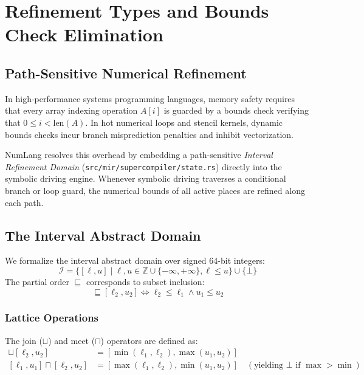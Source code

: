 \chapter{Refinement Types and Bounds Check Elimination}
\label{chap:refinements}

\section{Path-Sensitive Numerical Refinement}
\label{sec:refinements:intro}

In high-performance systems programming languages, memory safety requires that every array indexing operation $A[i]$ is guarded by a bounds check verifying that $0 \le i < \text{len}(A)$. In hot numerical loops and stencil kernels, dynamic bounds checks incur branch misprediction penalties and inhibit vectorization.

NumLang resolves this overhead by embedding a path-sensitive \emph{Interval Refinement Domain} (\texttt{src/mir/supercompiler/state.rs}) directly into the symbolic driving engine. Whenever symbolic driving traverses a conditional branch or loop guard, the numerical bounds of all active places are refined along each path.

\section{The Interval Abstract Domain}
\label{sec:refinements:lattice}

We formalize the interval abstract domain over signed 64-bit integers:
\begin{equation}
\mathcal{I} = \{ [\ell, u] \mid \ell, u \in \mathbb{Z} \cup \{-\infty, +\infty\}, \ell \le u \} \cup \{ \bot \}
\end{equation}
The partial order $\sqsubseteq$ corresponds to subset inclusion:
\begin{equation}
[\ell_1, u_1] \sqsubseteq [\ell_2, u_2] \iff \ell_2 \le \ell_1 \land u_1 \le u_2
\end{equation}

\subsection{Lattice Operations}
The join ($\sqcup$) and meet ($\sqcap$) operators are defined as:
\begin{align}
[\ell_1, u_1] \sqcup [\ell_2, u_2] &= [\min(\ell_1, \ell_2), \max(u_1, u_2)] \\
[\ell_1, u_1] \sqcap [\ell_2, u_2] &= [\max(\ell_1, \ell_2), \min(u_1, u_2)] \quad (\text{yielding } \bot \text{ if } \max > \min)
\end{align}

